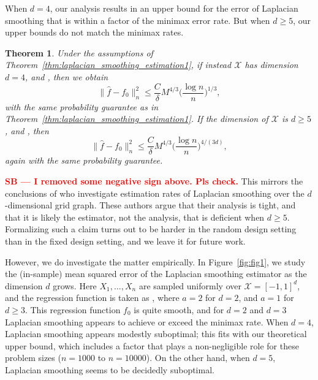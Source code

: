 \documentclass[twoside]{article}
\newcommand{\red}[1]{\textcolor{red}{#1}}
\newcommand{\sbcomment}[1]{{\bf{{\red{{SB --- #1}}}}}}
\newcommand{\1}{\mathbf{1}}
\newcommand{\Xset}{\mathcal{X}}
\newcommand{\wh}[1]{\widehat{#1}}
\newtheorem{theorem}{Theorem}
\theoremstyle{definition}
\theoremstyle{remark}
\begin{document}
When $d = 4$, our analysis results in an upper bound for the error of Laplacian smoothing that is within a  factor of the minimax error rate. But when $d \geq 5$, our upper bounds do not match the minimax rates.
\begin{theorem}
	\label{thm:laplacian_smoothing_estimation2}
	Under the assumptions of Theorem~\ref{thm:laplacian_smoothing_estimation1}, if instead $\Xset$ has dimension $d = 4$,  and , then we obtain 
	\begin{equation*}
	\bigl\|\wh{f} - f_0\bigr\|_n^2 \leq \frac{C}{\delta} M^{4/3} \biggl(\frac{\log n}{n}\biggr)^{1/3},
	\end{equation*}
	with the same probability guarantee as in Theorem~\ref{thm:laplacian_smoothing_estimation1}. If the dimension of $\Xset$ is $d \geq 5$,  and , then
	\begin{equation*}
	\bigl\|\wh{f} - f_0\bigr\|_n^2 \leq \frac{C}{\delta} M^{4/3} \biggl(\frac{\log n}{n}\biggr)^{4/(3d)},
	\end{equation*}
	again with the same probability guarantee.
\end{theorem}
\sbcomment{I removed some negative sign above. Pls check.}
This mirrors the conclusions of \citet{sadhanala16} who investigate estimation rates of Laplacian smoothing over the $d$-dimensional grid graph. These authors argue that their analysis is tight, and that it is likely the estimator, not the analysis, that is deficient when $d \geq 5$. Formalizing such a claim turns out to be harder in the random design setting than in the fixed design setting, and we leave it for future work. 

However, we do investigate the matter empirically. In Figure~\ref{fig:fig1}, we study the (in-sample) mean squared error of the Laplacian smoothing estimator as the dimension $d$ grows. Here $X_1,\ldots,X_n$ are sampled uniformly over $\Xset = [-1,1]^d$, and the regression function is taken as , where $a = 2$ for $d = 2$, and $a = 1$ for $d \geq 3$. This regression function $f_0$ is quite smooth, and for $d = 2$ and $d = 3$ Laplacian smoothing appears to achieve or exceed the minimax rate. When $d = 4$, Laplacian smoothing appears modestly suboptimal; this fits with our theoretical upper bound, which includes a  factor that plays a non-negligible role for these problem sizes ($n=1000$ to $n=10000$). On the other hand, when $d = 5$, Laplacian smoothing seems to be decidedly suboptimal. 
\end{document}
